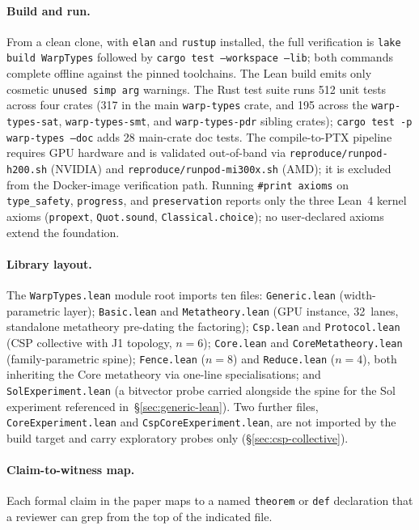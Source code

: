 \documentclass[acmsmall,screen,review,anonymous,nonacm]{acmart}
\begin{document}
\paragraph{Build and run.}
From a clean clone, with \texttt{elan} and \texttt{rustup} installed, the full verification is \texttt{lake build WarpTypes} followed by \texttt{cargo test --workspace --lib}; both commands complete offline against the pinned toolchains. The Lean build emits only cosmetic \texttt{unused simp arg} warnings. The Rust test suite runs 512 unit tests across four crates (317 in the main \texttt{warp-types} crate, and 195 across the \texttt{warp-types-sat}, \texttt{warp-types-smt}, and \texttt{warp-types-pdr} sibling crates); \texttt{cargo test -p warp-types --doc} adds 28 main-crate doc tests. The compile-to-PTX pipeline requires GPU hardware and is validated out-of-band via \texttt{reproduce/runpod-h200.sh} (NVIDIA) and \texttt{reproduce/runpod-mi300x.sh} (AMD); it is excluded from the Docker-image verification path. Running \texttt{\#print axioms} on \texttt{type\_safety}, \texttt{progress}, and \texttt{preservation} reports only the three Lean~4 kernel axioms (\texttt{propext}, \texttt{Quot.sound}, \texttt{Classical.choice}); no user-declared axioms extend the foundation.

\paragraph{Library layout.}
The \texttt{WarpTypes.lean} module root imports ten files: \texttt{Generic.lean} (width-parametric layer); \texttt{Basic.lean} and \texttt{Metatheory.lean} (GPU instance, 32~lanes, standalone metatheory pre-dating the factoring); \texttt{Csp.lean} and \texttt{Protocol.lean} (CSP collective with J1 topology, \(n=6\)); \texttt{Core.lean} and \texttt{CoreMetatheory.lean} (family-parametric spine); \texttt{Fence.lean} (\(n=8\)) and \texttt{Reduce.lean} (\(n=4\)), both inheriting the Core metatheory via one-line specialisations; and \texttt{SolExperiment.lean} (a bitvector probe carried alongside the spine for the Sol experiment referenced in~\S\ref{sec:generic-lean}). Two further files, \texttt{CoreExperiment.lean} and \texttt{CspCoreExperiment.lean}, are not imported by the build target and carry exploratory probes only (\S\ref{sec:csp-collective}).

\paragraph{Claim-to-witness map.}
Each formal claim in the paper maps to a named \texttt{theorem} or \texttt{def} declaration that a reviewer can grep from the top of the indicated file.
\end{document}
